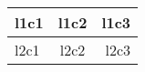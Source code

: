 \documentclass{article}
\begin{document}
	
	\begin{tabular}{|l|c|r|}
		\hline
		l1c1 & l1c2 & l1c3 \\
		\hline 
		l2c1 & l2c2 & l2c3 \\
		\hline
	\end{tabular}
	
\end{document}
